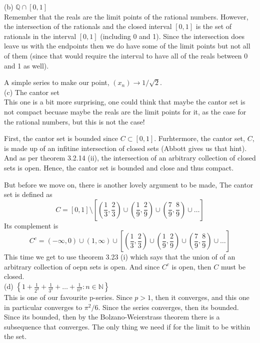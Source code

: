 (b) $\mathbb{Q} \cap [0,1]$
\\

Remember that the reals are the limit points of the rational numbers.
However, the intersection of the rationals and the closed interval $[0,1]$
is the set of rationals in the interval $[0,1]$ (including 0 and 1).
Since the intersection does leave us with the endpoints then we do have some of the limit points
but not all of them (since that would require the interval to have all of the reals between 0 and 1 as well).

A simple series to make our point, $(x_n) \rightarrow 1/\sqrt{2}$.
\\

(c) The cantor set
\\

This one is a bit more surprising, one could think that maybe the cantor set is not compact
becuase maybe the reals are the limit points for it, as the case for the rational numbers, but this is not the case!

First, the cantor set is bounded since $C \subset [0,1]$.
Furhtermore, the cantor set, $C$, is made up of an infitine intersection of closed sets (Abbott gives us that hint).
And as per theorem 3.2.14 (ii), the intersection of an arbitrary collection of closed sets is open.
Hence, the cantor set is bounded and close and thus compact.

But before we move on, there is another lovely argument to be made,
The cantor set is defined as
$$
C = [0,1] \setminus 
\left[
    \left(\frac{1}{3}, \frac{2}{3}\right) \cup
    \left(\frac{1}{9}, \frac{2}{9}\right) \cup
    \left(\frac{7}{9}, \frac{8}{9}\right) \cup
    \ldots
\right]
$$
Its complement is
$$
C^c = (-\infty, 0) \cup (1, \infty) \cup
\left[
    \left(\frac{1}{3}, \frac{2}{3}\right) \cup
    \left(\frac{1}{9}, \frac{2}{9}\right) \cup
    \left(\frac{7}{9}, \frac{8}{9}\right) \cup
    \ldots
\right]
$$
This time we get to use theorem 3.23 (i) which says that the union of of an arbitrary collection of oepn sets is open.
And since $C^c$ is open, then $C$ must be closed.
\\

(d) $\left\{ 1 + \frac{1}{2^2} + \frac{1}{3^2} + \ldots + \frac{1}{n^2} : n\in\mathbb{N} \right\}$
\\

This is one of our favourite p-series.
Since $p>1$, then it converges, and this one in particular converges to $\pi^2 / 6$.
Since the series converges, then its bounded.
Since its bounded, then by the Bolzano-Weierstrass theorem there is a subsequence that converges.
The only thing we need if for the limit to be within the set.

